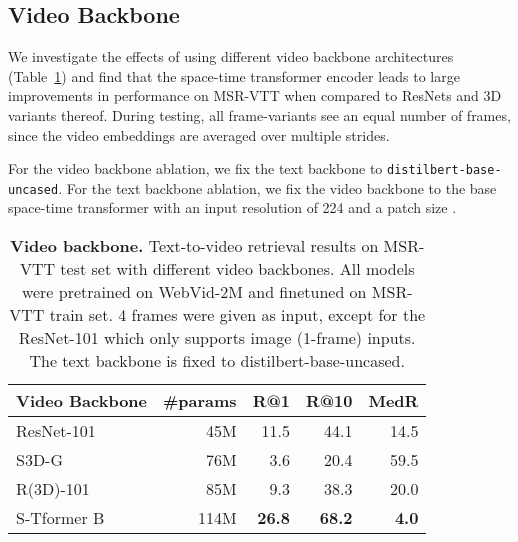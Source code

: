 \documentclass[10pt,twocolumn,letterpaper]{article}
\begin{document}
\subsection{Video Backbone}
We investigate the effects of using different video backbone architectures (Table~\ref{tab:vidbackbone}) and find that the space-time transformer encoder leads to large improvements in performance on MSR-VTT when compared to ResNets and 3D variants thereof. During testing, all frame-variants see an equal number of frames, since the video embeddings are averaged over multiple strides.

For the video backbone ablation, we fix the text backbone to \texttt{distilbert-base-uncased}. For the text backbone ablation, we fix the video backbone to the base space-time transformer with an input resolution of 224 and a patch size .
\begin{table}[h]
\centering
\caption{\textbf{Video backbone.} Text-to-video retrieval results on MSR-VTT test set with different video backbones. All models were pretrained on WebVid-2M and finetuned on MSR-VTT train set. 4 frames were given as input, except for the ResNet-101 which only supports image (1-frame) inputs. The text backbone is fixed to distilbert-base-uncased.}
\begin{tabular}{@{}lrrrr@{}}
\toprule
\textbf{Video Backbone}   & \textbf{\#params} & \textbf{R@1} & \textbf{R@10} & \textbf{MedR} \\ \midrule
ResNet-101                &     45M &         11.5 &          44.1 & 14.5          \\
S3D-G                     &     76M &          3.6 &          20.4 & 59.5          \\
R(3D)-101                 &     85M &          9.3 &         38.3 &  20.0       \\
S-Tformer  B    &    114M &\textbf{26.8} & \textbf{68.2} & \textbf{4.0}        \\
\bottomrule
\end{tabular}
\label{tab:vidbackbone}
\end{table} 
\end{document}
